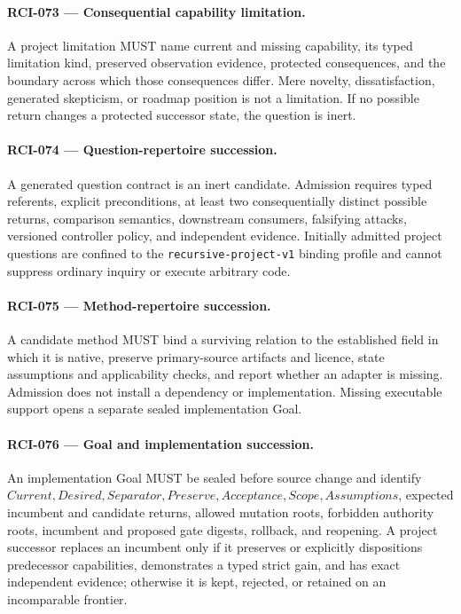 \documentclass[11pt]{article}
\begin{document}
\paragraph{RCI-073 --- Consequential capability limitation.}
A project limitation MUST name current and missing capability, its typed limitation
kind, preserved observation evidence, protected consequences, and the boundary across
which those consequences differ. Mere novelty, dissatisfaction, generated skepticism,
or roadmap position is not a limitation. If no possible return changes a protected
successor state, the question is inert.

\paragraph{RCI-074 --- Question-repertoire succession.}
A generated question contract is an inert candidate. Admission requires typed
referents, explicit preconditions, at least two consequentially distinct possible
returns, comparison semantics, downstream consumers, falsifying attacks, versioned
controller policy, and independent evidence. Initially admitted project questions are
confined to the \texttt{recursive-project-v1} binding profile and cannot suppress
ordinary inquiry or execute arbitrary code.

\paragraph{RCI-075 --- Method-repertoire succession.}
A candidate method MUST bind a surviving relation to the established field in which
it is native, preserve primary-source artifacts and licence, state assumptions and
applicability checks, and report whether an adapter is missing. Admission does not
install a dependency or implementation. Missing executable support opens a separate
sealed implementation Goal.

\paragraph{RCI-076 --- Goal and implementation succession.}
An implementation Goal MUST be sealed before source change and identify
\(Current,Desired,Separator,Preserve,Acceptance,Scope,Assumptions\), expected incumbent
and candidate returns, allowed mutation roots, forbidden authority roots, incumbent
and proposed gate digests, rollback, and reopening. A project successor replaces an
incumbent only if it preserves or explicitly dispositions predecessor capabilities,
demonstrates a typed strict gain, and has exact independent evidence; otherwise it is
kept, rejected, or retained on an incomparable frontier.
\end{document}
